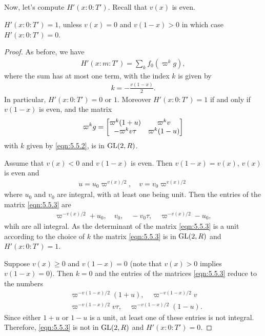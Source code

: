 \subsection{}
Now, let's compute $H'(x:0:T')$.
Recall that $v(x)$ is even.
\begin{proposition}\label{prop:5.5}
$H'(x:0:T')=1$, unless $v(x)=0$ and $v(1-x)>0$ in which case $H'(x:0:T')=0$.
\end{proposition}
\begin{proof}
As before, we have
\begin{align}
    H'(x:m:T') = \sum_{k} f_{0}(\varpi^k g),
\end{align}
where the sum has at most one term, with the index $k$ is given by
\begin{align}
\label{eqn:5.5.2}
    k = - \frac{v(1-x)}{2}.
\end{align}
In particular, $H'(x:0:T')=0$ or $1$.
Moreover $H'(x:0:T')=1$ if and only if $v(1-x)$ is even, and the matrix
\begin{align}
\label{eqn:5.5.3}
    \varpi^k g = \begin{bmatrix} \varpi^k(1+u) & \varpi^k v \\ -\varpi^k v\tau & \varpi^k(1-u) \end{bmatrix}
\end{align}
with $k$ given by \eqref{eqn:5.5.2}, is in $\mathrm{GL}(2, R)$.

Assume that $v(x) < 0$ and $v(1-x)$ is even.
Then $v(1-x) = v(x)$, $v(x)$ is even and
\begin{align*}
    u = u_0 \varpi^{v(x)/2}, \quad v = v_0 \varpi^{v(x) / 2}
\end{align*}
where $u_0$ and $v_0$ are integral, with at least one being unit.
Then the entries of the matrix \eqref{eqn:5.5.3} are
\begin{align*}
    \varpi^{-v(x) / 2} + u_0, \quad v_0, \quad -v_0 \tau, \quad \varpi^{-v(x) / 2} - u_0,
\end{align*}
whih are all integral.
As the determinant of the matrix \eqref{eqn:5.5.3} is a unit according to the choice of $k$ the matrix \eqref{eqn:5.5.3} is in $\mathrm{GL}(2, R)$ and $H'(x:0:T')=1$.

Suppose $v(x) \geq 0$ and $v(1-x)=0$ (note that $v(x) > 0$ implies $v(1-x)=0$).
Then $k=0$ and the entries of the matrices \eqref{eqn:5.5.3} reduce to the numbers
\begin{align*}
    & \varpi^{-v(1-x) / 2} (1+u), \quad \varpi^{-v(1-x)/2}v \\
    & \varpi^{-v(1-x)/2}v\tau, \quad \varpi^{-v(1-x)/2}(1-u).
\end{align*}
Since either $1+u$ or $1-u$ is a unit, at least one of these entries is not integral.
Therefore, \eqref{eqn:5.5.3} is not in $\mathrm{GL}(2,R)$ and $H'(x:0:T')=0$.
\end{proof}

